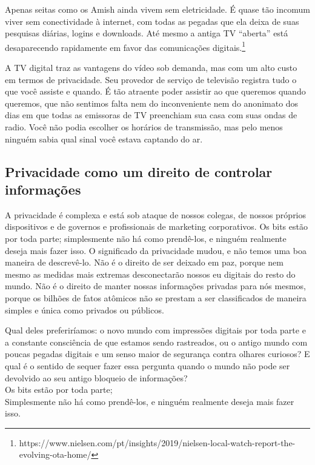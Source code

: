 \documentclass{book}
\begin{document}
Apenas seitas como os Amish ainda vivem sem eletricidade. É quase tão incomum
viver sem conectividade à internet, com todas as pegadas que ela deixa de suas
pesquisas diárias, logins e downloads. Até mesmo a antiga TV ``aberta'' está
desaparecendo rapidamente em favor das comunicações 
digitais.\footnote{https://www.nielsen.com/pt/insights/2019/nielsen-local-watch-report-the-evolving-ota-home/}

A TV digital traz as vantagens do vídeo sob demanda, mas com um alto custo em
termos de privacidade. Seu provedor de serviço de televisão registra tudo o que
você assiste e quando. É tão atraente poder assistir ao que queremos quando
queremos, que não sentimos falta nem do inconveniente nem do anonimato dos dias
em que todas as emissoras de TV preenchiam sua casa com suas ondas de radio.
Você não podia escolher os horários de transmissão, mas pelo menos ninguém sabia
qual sinal você estava captando do ar.

\subsection{Privacidade como um direito de controlar informações}
\label{cap3:quem-principios-controlar}
A privacidade é complexa e está sob ataque de nossos colegas, de nossos próprios
dispositivos e de governos e profissionais de marketing corporativos. Os bits
estão por toda parte; simplesmente não há como prendê-los, e ninguém realmente
deseja mais fazer isso. O significado da privacidade mudou, e não temos uma boa
maneira de descrevê-lo. Não é o direito de ser deixado em paz, porque nem mesmo
as medidas mais extremas desconectarão nossos eu digitais do resto do mundo.
Não é o direito de manter nossas informações privadas para nós mesmos, porque
os bilhões de fatos atômicos não se prestam a ser classificados de maneira
simples e única como privados ou públicos.

Qual deles preferiríamos: o novo mundo com impressões digitais por toda parte
e a constante consciência de que estamos sendo rastreados, ou o antigo mundo
com poucas pegadas digitais e um senso maior de segurança contra olhares
curiosos? E qual é o sentido de sequer fazer essa pergunta quando o mundo não
pode ser devolvido ao seu antigo bloqueio de informações?\\

Os bits estão por toda parte;\\
Simplesmente não há como prendê-los, e ninguém realmente deseja mais fazer isso.\\
\end{document}
